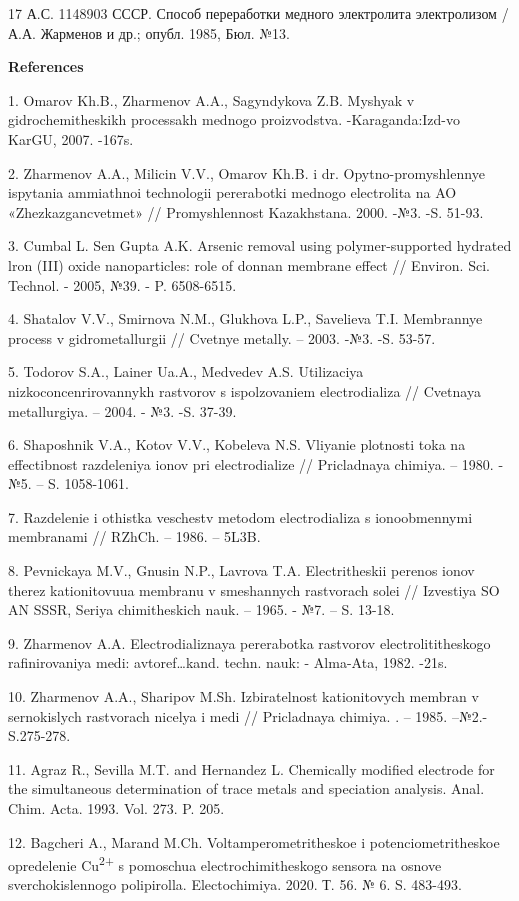 17 А.С. 1148903 СССР. Способ переработки медного электролита
электролизом / А.А. Жарменов и др.; опубл. 1985, Бюл. №13.

{\bfseries References}

1. Omarov Kh.B., Zharmenov A.A., Sagyndykova Z.B. Myshyak v
gidrochemitheskikh processakh mednogo proizvodstva. -Karaganda:Izd-vo
KarGU, 2007. -167s.

2. Zharmenov A.A., Milicin V.V., Omarov Kh.B. i dr. Opytno-promyshlennye
ispytania ammiathnoi technologii pererabotki mednogo electrolita na AO
«Zhezkazgancvetmet» // Promyshlennost Kazakhstana. 2000. -№3. -S. 51-93.

3. Cumbal L. Sen Gupta A.K. Arsenic removal using polymer-supported
hydrated lron (III) oxide nanoparticles: role of donnan membrane effect
// Environ. Sci. Technol. - 2005, №39. - P. 6508-6515.

4. Shatalov V.V., Smirnova N.M., Glukhova L.P., Savelieva T.I.
Membrannye process v gidrometallurgii // Cvetnye metally. -- 2003. -№3.
-S. 53-57.

5. Todorov S.A., Lainer Ua.A., Medvedev A.S. Utilizaciya
nizkoconcenrirovannykh rastvorov s ispolzovaniem electrodializa //
Cvetnaya metallurgiya. -- 2004. - №3. -S. 37-39.

6. Shaposhnik V.A., Kotov V.V., Kobeleva N.S. Vliyanie plotnosti toka na
effectibnost razdeleniya ionov pri electrodialize // Pricladnaya
chimiya. -- 1980. - №5. -- S. 1058-1061.

7. Razdelenie i othistka veschestv metodom electrodializa s
ionoobmennymi membranami // RZhCh. -- 1986. -- 5L3B.

8. Pevnickaya M.V., Gnusin N.P., Lavrova T.A. Electritheskii perenos
ionov therez kationitovuua membranu v smeshannych rastvorach solei //
Izvestiya SO AN SSSR, Seriya chimitheskich nauk. -- 1965. - №7. -- S.
13-18.

9. Zharmenov A.A. Electrodializnaya pererabotka rastvorov
electrolititheskogo rafinirovaniya medi: avtoref\ldots kand. techn.
nauk: - Alma-Ata, 1982. -21s.

10. Zharmenov A.A., Sharipov M.Sh. Izbiratelnost kationitovych membran v
sernokislych rastvorach nicelya i medi // Pricladnaya chimiya. . --
1985. --№2.-S.275-278.

11. Agraz R., Sevilla M.T. and Hernandez L. Chemically modified
electrode for the simultaneous determination of trace metals and
speciation analysis. Anal. Chim. Acta. 1993. Vol. 273. P. 205.

12. Bagcheri A., Marand M.Ch. Voltamperometritheskoe i
potenciometritheskoe opredelenie Cu\textsuperscript{2+} s pomoschua
electrochimitheskogo sensora na osnove sverchokislennogo polipirolla.
Electochimiya. 2020. Т. 56. № 6. S. 483-493.

